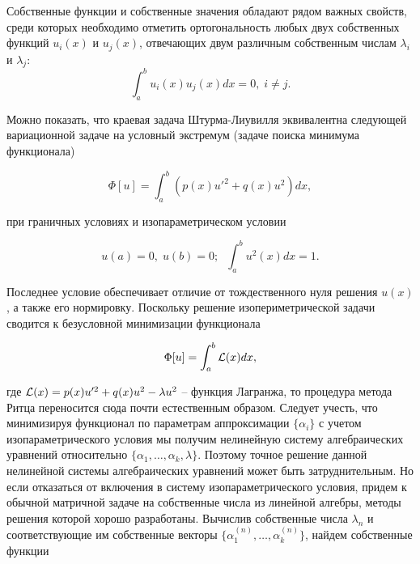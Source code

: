 \documentclass{article}
\begin{document}
\begin{info}
	Собственные функции и собственные значения обладают рядом важных свойств, среди которых необходимо отметить ортогональность любых двух собственных функций $u_{i}(x)$ и $u_{j}(x)$, отвечающих двум различным собственным числам $\lambda_{i}$ и $\lambda_{j}$:
	\begin{displaymath}
		\int_{a}^{b} u_{i}(x) u_{j}(x) dx = 0, \; i \neq j.
	\end{displaymath}
\end{info}

Можно показать, что краевая задача Штурма-Лиувилля эквивалентна следующей вариационной задаче на условный экстремум (задаче поиска минимума функционала)

\begin{displaymath}
	\Phi[u] = \int_{a}^{b} \left( p(x)u'^{2} + q(x)u^{2} \right) dx,
\end{displaymath}

\noindent при граничных условиях и изопараметрическом условии

\begin{displaymath}
	u(a) = 0, \; u(b) = 0; \; \; \int_{a}^{b} u^{2}(x)dx = 1.
\end{displaymath}

Последнее условие обеспечивает отличие от тождественного нуля решения $u(x)$, а также его нормировку. Поскольку решение изопериметрической задачи сводится к безусловной минимизации функционала

\begin{displaymath}
	\Phi[u] = \int_{a}^{b} \mathcal{L}(x) dx, 
\end{displaymath}

\noindent где $\mathcal{L}(x) = p(x)u'^{2} + q(x)u^{2} - \lambda u^{2}$ -- функция Лагранжа, то процедура метода Ритца переносится сюда почти естественным образом. Следует учесть, что минимизируя функционал по параметрам аппроксимации $\{\alpha_{i}\}$ с учетом изопараметрического условия мы получим нелинейную систему алгебраических уравнений относительно $\{\alpha_{1}, \dots, \alpha_{k}, \lambda\}$. Поэтому точное решение данной нелинейной системы алгебраических уравнений может быть затруднительным. Но если отказаться от включения в систему изопараметрического условия, придем к обычной матричной задаче на собственные числа из линейной алгебры, методы решения которой хорошо разработаны. Вычислив собственные числа $\lambda_{n}$ и соответствующие им собственные векторы $\{\alpha_{1}^{(n)}, \dots, \alpha_{k}^{(n)}\}$, найдем собственные функции
\end{document}
